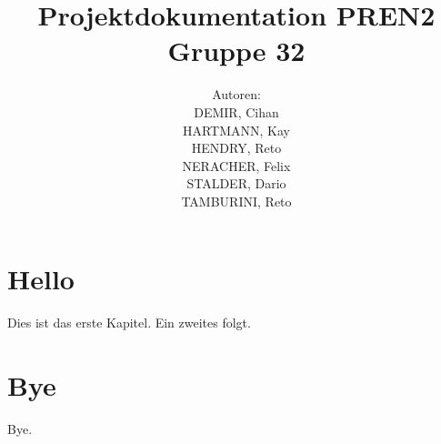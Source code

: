 \documentclass[11pt,german]{article}
\author{	Autoren:\\
			DEMIR, Cihan\\
			HARTMANN, Kay\\
			HENDRY, Reto\\
			NERACHER, Felix\\			
			STALDER, Dario\\
			TAMBURINI, Reto\\
		}
\title{Projektdokumentation PREN2\\Gruppe 32}
\begin{document}
  \maketitle
  \tableofcontents
	\newpage	
  \section{Hello}
  Dies ist das erste Kapitel.
  Ein zweites folgt.
  \section{Bye}
  Bye.
\end{document}
